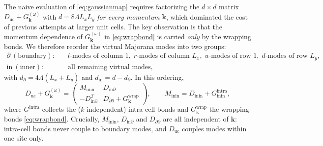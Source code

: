 \documentclass[11pt,a4paper]{article}
\newcommand{\uc}{\mathrm{uc}}
\newcommand{\bdry}{\partial}
\newcommand{\inn}{\mathrm{in}}
\begin{document}
The naive evaluation of \eqref{eq:gaussianmap} requires factorizing the
$d \times d$ matrix $D_{\uc} + G^{(\omega)}_{\bm k}$ with
$d = 8\Lambda L_x L_y$ \emph{for every momentum} $\bm k$, which dominated
the cost of previous attempts at larger unit cells. The key observation is
that the momentum dependence of $G^{(\omega)}_{\bm k}$ in
\eqref{eq:wrapbond} is carried \emph{only} by the wrapping bonds. We
therefore reorder the virtual Majorana modes into two groups:
\begin{align*}
  \bdry \ (\text{boundary}):&\quad
  l\text{-modes of column } 1,\;
  r\text{-modes of column } L_x,\;
  u\text{-modes of row } 1,\;
  d\text{-modes of row } L_y,\\
  \inn \ (\text{inner}):&\quad \text{all remaining virtual modes},
\end{align*}
with $d_\bdry = 4\Lambda(L_x + L_y)$ and $d_\inn = d - d_\bdry$. In this
ordering,
\begin{equation}
  D_{\uc} + G^{(\omega)}_{\bm k}
  =
  \begin{pmatrix}
    M_{\inn\inn} & D_{\inn\bdry} \\
    -D_{\inn\bdry}^{T} & D_{\bdry\bdry} + G^{\mathrm{wrap}}_{\bm k}
  \end{pmatrix},
  \qquad
  M_{\inn\inn} = D_{\inn\inn} + G^{\mathrm{intra}}_{\inn\inn},
  \label{eq:blockstructure}
\end{equation}
where $G^{\mathrm{intra}}$ collects the ($k$-independent) intra-cell bonds
and $G^{\mathrm{wrap}}_{\bm k}$ the wrapping bonds
\eqref{eq:wrapbond}. Crucially, $M_{\inn\inn}$, $D_{\inn\bdry}$ and
$D_{\bdry\bdry}$ are all independent of $\bm k$: intra-cell bonds never
couple to boundary modes, and $D_{\uc}$ couples modes within one site only.
\end{document}
